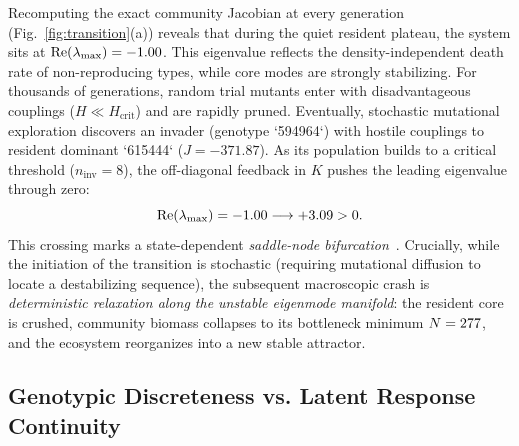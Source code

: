\documentclass[twocolumn,amsmath,amssymb,aps,pra,10pt,floatfix,nofootinbib]{revtex4-2}
\begin{document}
Recomputing the exact community Jacobian at every generation (Fig.~\ref{fig:transition}(a)) reveals that during the quiet resident plateau, the system sits at $\mathrm{Re}(\lambda_{\max}) = -1.00$. This eigenvalue reflects the density-independent death rate of non-reproducing types, while core modes are strongly stabilizing. For thousands of generations, random trial mutants enter with disadvantageous couplings ($H \ll H_{\text{crit}}$) and are rapidly pruned. Eventually, stochastic mutational exploration discovers an invader (genotype `594964`) with hostile couplings to resident dominant `615444` ($J = -371.87$). As its population builds to a critical threshold ($n_{\text{inv}} = 8$), the off-diagonal feedback in $K$ pushes the leading eigenvalue through zero:
\begin{equation}
\mathrm{Re}(\lambda_{\max}) = -1.00 \longrightarrow +3.09 > 0.
\end{equation}
This crossing marks a state-dependent \textit{saddle-node bifurcation}~\cite{cairoli2014forecasting}. Crucially, while the initiation of the transition is stochastic (requiring mutational diffusion to locate a destabilizing sequence), the subsequent macroscopic crash is \textit{deterministic relaxation along the unstable eigenmode manifold}: the resident core is crushed, community biomass collapses to its bottleneck minimum $N = 277$, and the ecosystem reorganizes into a new stable attractor.

\subsection{Genotypic Discreteness vs. Latent Response Continuity}
\end{document}
